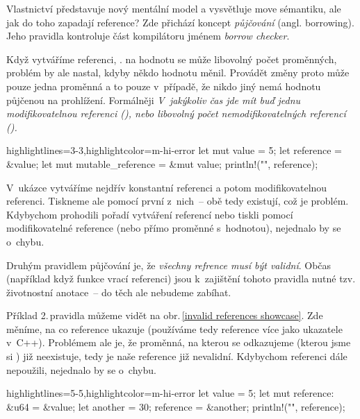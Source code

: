 \documentclass[main.tex]{subfiles}
\begin{document}

Vlastnictví představuje nový mentální model a vysvětluje move sémantiku, ale jak do toho
zapadají reference? Zde přichází koncept \emph{půjčování} (angl. borrowing). Jeho pravidla
kontroluje část kompilátoru jménem \emph{borrow checker}.

Když vytváříme referenci, .  na hodnotu se může
libovolný počet proměnných, problém by ale nastal, kdyby někdo hodnotu měnil. Provádět
změny proto může pouze jedna proměnná a to pouze v~případě, že nikdo jiný nemá hodnotu
půjčenou na prohlížení. Formálněji \emph{V~jakýkoliv čas jde mít buď jednu
    modifikovatelnou referenci (), nebo libovolný počet nemodifikovatelných
    referencí ().} \cite[sekce\,4.2]{thebook}

\obrazek
\begin{rustcode*}{highlightlines={3-3},highlightcolor=m-hi-error}
    let mut value = 5;
    let reference = &value;
    let mut mutable_reference = &mut value;
    println!("{}", reference);
\end{rustcode*}
\newline
{}

V~ukázce vytváříme nejdřív konstantní referenci a potom modifikovatelnou referenci.
Tiskneme ale pomocí první z~nich~-- obě tedy existují, což je problém. Kdybychom prohodili
pořadí vytváření referencí nebo tiskli pomocí modifikovatelné reference (nebo přímo
proměnné s~hodnotou), nejednalo by se o~chybu.

Druhým pravidlem půjčování je, že \emph{všechny refrence musí být validní}. Občas
(například když funkce vrací referenci) jsou k~zajištění tohoto pravidla nutné tzv.
životnostní anotace~-- do těch ale nebudeme zabíhat.

Příklad 2.\,pravidla můžeme vidět na obr.\,\ref{invalid references showcase}. Zde měníme,
na co reference ukazuje (používáme tedy reference více jako ukazatele v~C++). Problémem
ale je, že proměnná, na kterou se odkazujeme (kterou jsme si ) již neexistuje,
tedy je naše reference již nevalidní. Kdybychom referenci dále nepoužili, nejednalo by se
o~chybu.

\obrazek
\begin{rustcode*}{highlightlines={5-5},highlightcolor=m-hi-error}
    let value = 5;
    let mut reference: &u64 = &value;
    {
        let another = 30;
        reference = &another;
    }
    println!("{}", reference);
\end{rustcode*}
\newline
{}
\end{document}
